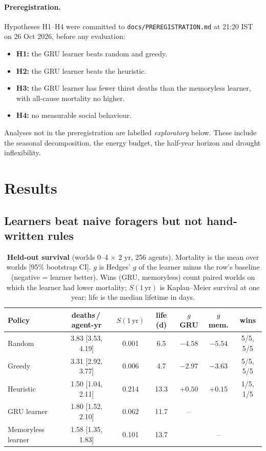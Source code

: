 \documentclass[10pt]{article}
\newcommand{\dpay}{deaths\,/\,agent-yr}
\begin{document}
\paragraph{Preregistration.}
Hypotheses H1--H4 were committed to \texttt{docs/PREREGISTRATION.md} at 21:20 IST on 26 Oct 2026, before any
evaluation:
\begin{itemize}
\item \textbf{H1:} the GRU learner beats random and greedy.
\item \textbf{H2:} the GRU learner beats the heuristic.
\item \textbf{H3:} the GRU learner has fewer thirst deaths than the memoryless learner, with all-cause mortality no
higher.
\item \textbf{H4:} no measurable social behaviour.
\end{itemize}
Analyses not in the preregistration are labelled \emph{exploratory} below. These include the seasonal decomposition,
the energy budget, the half-year horizon and drought inflexibility.

\section{Results}
\label{sec:results}

\subsection{Learners beat naive foragers but not hand-written rules}

\begin{table}[t]
\centering\small
\caption{\textbf{Held-out survival} (worlds 0--4 $\times$ 2 yr, 256 agents). Mortality is the mean over worlds
[95\% bootstrap CI]. $g$ is Hedges' $g$ of the learner minus the row's baseline (negative = learner better). Wins
(GRU, memoryless) count paired worlds on which the learner had lower mortality; $S(1\,\text{yr})$ is Kaplan--Meier
survival at one year; life is the median lifetime in days.}
\label{tab:main}
\setlength{\tabcolsep}{4pt}\begin{tabular}{@{}lcccccc@{}}
\toprule
Policy & \dpay{} & $S(1\,\text{yr})$ & life (d) & $g$ GRU & $g$ mem. & wins\\
\midrule
Random            & 3.83 [3.53, 4.19] & 0.001 & 6.5  & $-4.58$ & $-5.54$ & 5/5, 5/5\\
Greedy            & 3.31 [2.92, 3.77] & 0.006 & 4.7  & $-2.97$ & $-3.63$ & 5/5, 5/5\\
Heuristic         & 1.50 [1.04, 2.11] & 0.214 & 13.3 & $+0.50$ & $+0.15$ & 1/5, 1/5\\
\midrule
GRU learner       & 1.80 [1.52, 2.10] & 0.062 & 11.7 & -- & & \\
Memoryless learner& 1.58 [1.35, 1.83] & 0.101 & 13.7 & & -- & \\
\bottomrule
\end{tabular}
\end{table}
\end{document}
